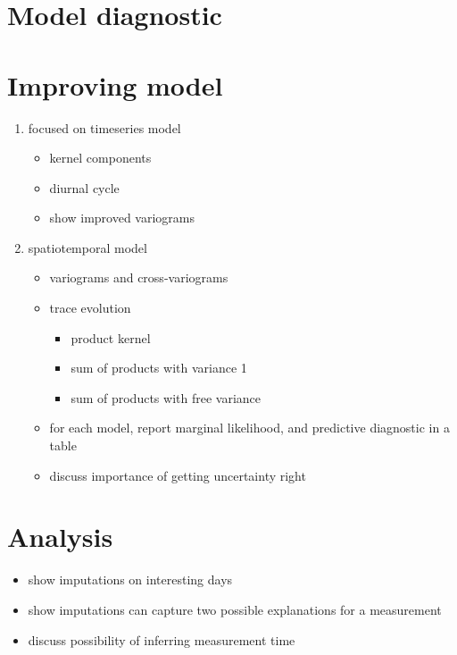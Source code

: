 \documentclass[letter]{article}
\providecommand{\tightlist}{%
      \setlength{\itemsep}{0pt}\setlength{\parskip}{0pt}}
\providecommand{\tightlist}{%
  	  \setlength{\itemsep}{0pt}\setlength{\parskip}{0pt}}
\begin{document}
    	\section{Model diagnostic}\label{model-diagnostic}
    


    	\section{Improving model}\label{improving-model}

\begin{enumerate}
\def\labelenumi{\arabic{enumi}.}
\tightlist
\item
  focused on timeseries model

  \begin{itemize}
  \tightlist
  \item
    kernel components
  \item
    diurnal cycle
  \item
    show improved variograms
  \end{itemize}
\item
  spatiotemporal model

  \begin{itemize}
  \tightlist
  \item
    variograms and cross-variograms
  \item
    trace evolution

    \begin{itemize}
    \tightlist
    \item
      product kernel
    \item
      sum of products with variance 1
    \item
      sum of products with free variance
    \end{itemize}
  \item
    for each model, report marginal likelihood, and predictive
    diagnostic in a table
  \item
    discuss importance of getting uncertainty right
  \end{itemize}
\end{enumerate}

\section{Analysis}\label{analysis}

\begin{itemize}
\tightlist
\item
  show imputations on interesting days
\item
  show imputations can capture two possible explanations for a
  measurement
\item
  discuss possibility of inferring measurement time
\end{itemize}
    
\end{document}
